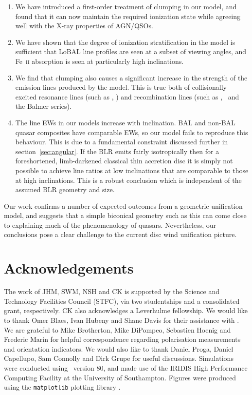 \documentclass[useAMS,usenatbib]{mn2e_x}
\begin{document}
\begin{enumerate}
\item We have introduced a first-order treatment 
of clumping in our model, and found that it can now maintain
the required ionization state while agreeing well with the X-ray
properties of AGN/QSOs.
\smallskip
\item We have shown that the degree of ionization stratification
in the model is sufficient that LoBAL line profiles
are seen at a subset of viewing angles, and Fe~\textsc{ii}
absorption is seen at particularly high inclinations.
\smallskip
\item We find that clumping also causes a significant 
increase in the strength of the  emission
lines produced by the model. This is true both
of collisionally excited resonance lines (such as \civ, \nv)
and recombination lines (such as \la, \ha\ and the Balmer series).
\smallskip
\item The line EWs in our models increase with inclination.
BAL and non-BAL quasar composites have comparable EWs, so our model
fails to reproduce this behaviour.
This is due to a fundamental constraint discussed further in section~\ref{sec:angular}. If the BLR
emits fairly isotropically then for a foreshortened, limb-darkened classical thin accretion disc
it is simply not possible to achieve line ratios at low inclinations that are comparable to
those at high inclinations. This is a robust conclusion which 
is independent of the assumed BLR geometry and size.
\end{enumerate}
Our work confirms a number of expected outcomes from a geometric unification 
model, and suggests that a simple biconical geometry such as this can come close to 
explaining much of the  phenomenology of quasars. Nevertheless, our conclusions pose 
a clear challenge to the current disc wind unification picture.

\section*{Acknowledgements}

The work of JHM, SWM, NSH and CK is supported by the
Science and Technology Facilities Council (STFC),
via two studentships and a consolidated grant, respectively.
CK also acknowledges a Leverhulme fellowship.
We would like to thank Omer Blaes, Ivan Hubeny and Shane Davis for their
assistance with \agn. We are grateful to Mike Brotherton, Mike DiPompeo,
Sebastien Hoenig and Frederic Marin for helpful correspondence regarding
polarisation measurements and orientation indicators.
We would also like to thank Daniel Proga, Daniel Capellupo, Sam Connolly and
Dirk Grupe for useful discussions.  Simulations were conducted using \py\ version 80,
and made use of the IRIDIS High Performance Computing Facility at the
University of Southampton. Figures were produced using the {\tt matplotlib} plotting library
\citep{matplotlib}.




\clearpage
\clearpage
\end{document}
